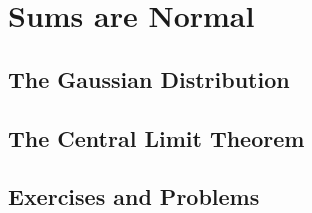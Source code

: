 \section{Sums are Normal}

\subsection{The Gaussian Distribution}

\subsection{The Central Limit Theorem}

\subsection{Exercises and Problems}